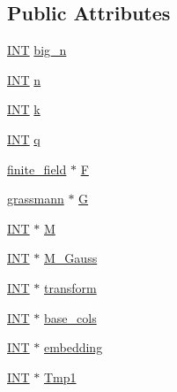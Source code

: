 \subsection*{Public Attributes}
\begin{DoxyCompactItemize}
\item 
\mbox{\hyperlink{galois_8h_a09fddde158a3a20bd2dcadb609de11dc}{I\+NT}} \mbox{\hyperlink{classgrassmann__embedded_aad39dd5ac4920ce008105a2261da36f4}{big\+\_\+n}}
\item 
\mbox{\hyperlink{galois_8h_a09fddde158a3a20bd2dcadb609de11dc}{I\+NT}} \mbox{\hyperlink{classgrassmann__embedded_ae1c6e1de2be244c0f3be3ee321ba67a1}{n}}
\item 
\mbox{\hyperlink{galois_8h_a09fddde158a3a20bd2dcadb609de11dc}{I\+NT}} \mbox{\hyperlink{classgrassmann__embedded_aa836ced02289c8a795581bd13627bb6d}{k}}
\item 
\mbox{\hyperlink{galois_8h_a09fddde158a3a20bd2dcadb609de11dc}{I\+NT}} \mbox{\hyperlink{classgrassmann__embedded_a1a6563cfa3993441724fdadd156dab6a}{q}}
\item 
\mbox{\hyperlink{classfinite__field}{finite\+\_\+field}} $\ast$ \mbox{\hyperlink{classgrassmann__embedded_ac900e0ebf899282c895777675a844b0d}{F}}
\item 
\mbox{\hyperlink{classgrassmann}{grassmann}} $\ast$ \mbox{\hyperlink{classgrassmann__embedded_a33ae25817c1a5b00e23c84af8495bb1e}{G}}
\item 
\mbox{\hyperlink{galois_8h_a09fddde158a3a20bd2dcadb609de11dc}{I\+NT}} $\ast$ \mbox{\hyperlink{classgrassmann__embedded_a9a105dbabb1733b0198734a91727e074}{M}}
\item 
\mbox{\hyperlink{galois_8h_a09fddde158a3a20bd2dcadb609de11dc}{I\+NT}} $\ast$ \mbox{\hyperlink{classgrassmann__embedded_ab561a20b480d7f1c7fc4fcafa6cfbba6}{M\+\_\+\+Gauss}}
\item 
\mbox{\hyperlink{galois_8h_a09fddde158a3a20bd2dcadb609de11dc}{I\+NT}} $\ast$ \mbox{\hyperlink{classgrassmann__embedded_a7b2d9b45c4ab15bf67f70c29b663c96a}{transform}}
\item 
\mbox{\hyperlink{galois_8h_a09fddde158a3a20bd2dcadb609de11dc}{I\+NT}} $\ast$ \mbox{\hyperlink{classgrassmann__embedded_a50209e73ce006032128d203aa2a78c2e}{base\+\_\+cols}}
\item 
\mbox{\hyperlink{galois_8h_a09fddde158a3a20bd2dcadb609de11dc}{I\+NT}} $\ast$ \mbox{\hyperlink{classgrassmann__embedded_ab7ef43e7b26c347bcbc00ef72add14c9}{embedding}}
\item 
\mbox{\hyperlink{galois_8h_a09fddde158a3a20bd2dcadb609de11dc}{I\+NT}} $\ast$ \mbox{\hyperlink{classgrassmann__embedded_aa04a9949300f15cfd2330e1b77d278f1}{Tmp1}}

\end{DoxyCompactItemize}
